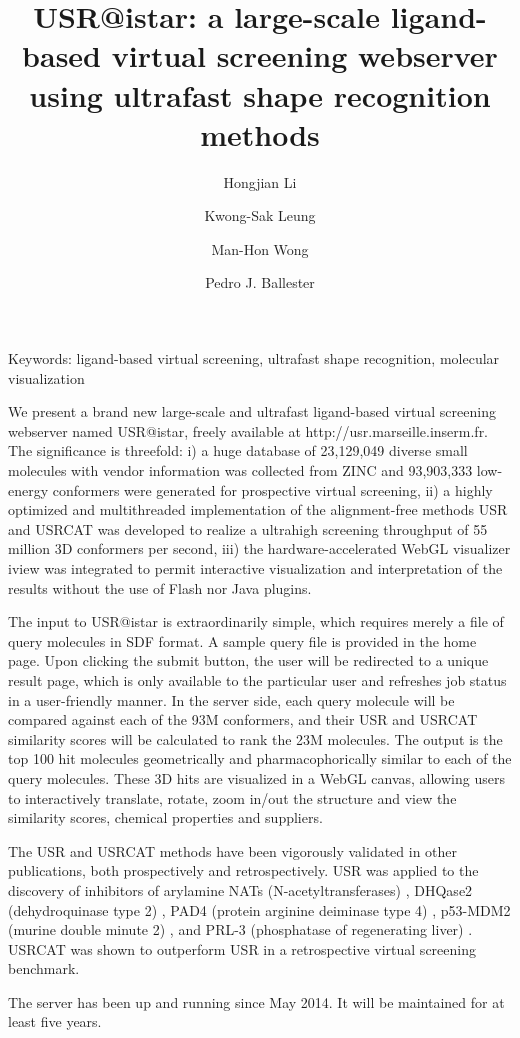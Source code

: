 \documentclass[a4paper,10pt]{article}
\title{USR@istar: a large-scale ligand-based virtual screening webserver using ultrafast shape recognition methods}
\author[1]{Hongjian Li}
\author[1]{Kwong-Sak Leung}
\author[1]{Man-Hon Wong}
\author[2]{Pedro J. Ballester}
\affil[1]{Department of Computer Science and Engineering, Chinese University of Hong Kong.}
\affil[ ]{\{hjli,ksleung,mhwong\}@cse.cuhk.edu.hk}
\affil[2]{Cancer Research Center of Marseille, INSERM U1068; Institut Paoli-Calmettes; Aix-Marseille Universit\'{e}; CNRS UMR7258, Marseille, France.}
\affil[ ]{pedro.ballester@inserm.fr}
\begin{document}
\date{}
\maketitle
\thispagestyle{title}
\noindent Keywords: ligand-based virtual screening, ultrafast shape recognition, molecular visualization

We present a brand new large-scale and ultrafast ligand-based virtual screening webserver named USR@istar, freely available at http://usr.marseille.inserm.fr. The significance is threefold: i) a huge database of 23,129,049 diverse small molecules with vendor information was collected from ZINC \cite{532,1178} and 93,903,333 low-energy conformers were generated for prospective virtual screening, ii) a highly optimized and multithreaded implementation of the alignment-free methods USR \cite{1379} and USRCAT \cite{1331} was developed to realize a ultrahigh screening throughput of 55 million 3D conformers per second, iii) the hardware-accelerated WebGL visualizer iview \cite{1366} was integrated to permit interactive visualization and interpretation of the results without the use of Flash nor Java plugins.

The input to USR@istar is extraordinarily simple, which requires merely a file of query molecules in SDF format. A sample query file is provided in the home page. Upon clicking the submit button, the user will be redirected to a unique result page, which is only available to the particular user and refreshes job status in a user-friendly manner. In the server side, each query molecule will be compared against each of the 93M conformers, and their USR \cite{1379} and USRCAT \cite{1331} similarity scores will be calculated to rank the 23M molecules. The output is the top 100 hit molecules geometrically and pharmacophorically similar to each of the query molecules. These 3D hits are visualized in a WebGL canvas, allowing users to interactively translate, rotate, zoom in/out the structure and view the similarity scores, chemical properties and suppliers.

The USR \cite{1379} and USRCAT \cite{1331} methods have been vigorously validated in other publications, both prospectively and retrospectively. USR \cite{1379} was applied to the discovery of inhibitors of arylamine NATs (N-acetyltransferases) \cite{1380}, DHQase2 (dehydroquinase type 2) \cite{1281}, PAD4 (protein arginine deiminase type 4) \cite{1504}, p53-MDM2 (murine double minute 2) \cite{1502}, and PRL-3 (phosphatase of regenerating liver) \cite{1615}. USRCAT \cite{1331} was shown to outperform USR in a retrospective virtual screening benchmark.

The server has been up and running since May 2014. It will be maintained for at least five years.

\linespread{0.5}
\tiny


\end{document}
